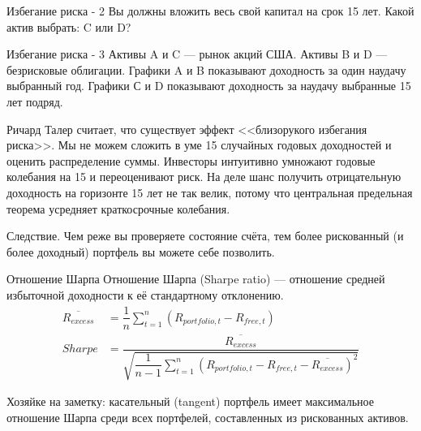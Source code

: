 \documentclass{beamer}
\begin{document}
\begin{frame}{Избегание риска - 2}
\justify
Вы должны вложить весь свой капитал на срок 15 лет. Какой актив выбрать: C или D?

\centering
{}
\end{frame}



\begin{frame}{Избегание риска - 3}
\justify
Активы A и C --- рынок акций США. Активы B и D --- безрисковые облигации. Графики A и B показывают доходность за один наудачу выбранный год. Графики С и D показывают доходность за наудачу выбранные 15 лет подряд.

\justify
Ричард Талер считает, что существует эффект <<близорукого избегания риска>>. Мы не можем сложить в уме 15 случайных годовых доходностей и оценить распределение суммы. Инвесторы интуитивно умножают годовые колебания на 15 и переоценивают риск. На деле шанс получить отрицательную доходность на горизонте 15 лет не так велик, потому что центральная предельная теорема усредняет краткосрочные колебания.

\justify
Следствие. Чем реже вы проверяете состояние счёта, тем более рискованный (и более доходный) портфель вы можете себе позволить.
\end{frame}



\begin{frame}{Отношение Шарпа}
\justify
Отношение Шарпа (Sharpe ratio) --- отношение средней избыточной доходности к её стандартному отклонению.
\begin{align*}
\overline{R_{excess}} &= \dfrac{1}{n}\sum\limits_{t=1}^{n}(R_{portfolio,t} - R_{free,t})\\
Sharpe &= \dfrac{\overline{R_{excess}}}{\sqrt{\dfrac{1}{n-1}\sum\limits_{t=1}^{n}(R_{portfolio,t} - R_{free,t} - \overline{R_{excess}})^2}}
\end{align*}

Хозяйке на заметку: касательный (tangent) портфель имеет максимальное отношение Шарпа среди всех портфелей, составленных из рискованных активов.
\end{frame}
\end{document}
